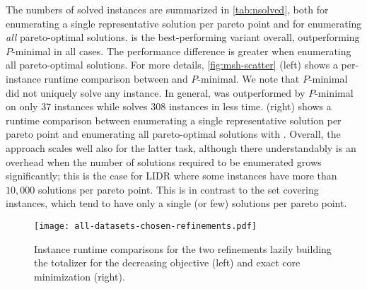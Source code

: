 The numbers of solved instances are summarized in \cref{tab:nsolved}, both for  enumerating a single representative solution per pareto point and for enumerating \emph{all} pareto-optimal solutions.
\msh{} is the best-performing \algname{} variant overall, outperforming $P$-minimal in all cases.
The performance difference is greater when enumerating all pareto-optimal solutions.
For more details, \cref{fig:msh-scatter} (left) shows a per-instance runtime comparison between \msh{} and $P$-minimal.
We note that $P$-minimal did not uniquely solve any instance.
In general, \msh{} was outperformed by $P$-minimal on only 37 instances while \msh{} solves 308 instances in less time.
 (right) shows a runtime comparison between enumerating a single representative solution per pareto point and enumerating all pareto-optimal solutions with \msh{}.
Overall, the approach scales well also for the latter task, although there understandably is an overhead when the number of solutions required to be enumerated grows significantly;
this is the case for LIDR where some instances have more than $10,000$ solutions per pareto point.
This is in contrast to the set covering instances, which tend to have only a single (or few) solutions per pareto point.

\begin{figure}
    \centering
    \texttt{[image: all-datasets-chosen-refinements.pdf]}
    \caption{Instance runtime comparisons for the two refinements lazily building the totalizer for the decreasing objective (left) and exact core minimization (right).
      } \label{fig:refinements}
\end{figure}

